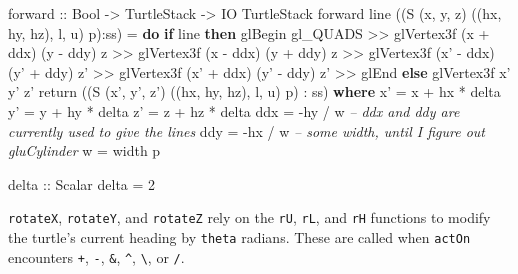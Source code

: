 \documentclass[]{article}
\newenvironment{Shaded}{}{}
\newcommand{\KeywordTok}[1]{\textcolor[rgb]{0.00,0.44,0.13}{\textbf{{#1}}}}
\newcommand{\DataTypeTok}[1]{\textcolor[rgb]{0.56,0.13,0.00}{{#1}}}
\newcommand{\DecValTok}[1]{\textcolor[rgb]{0.25,0.63,0.44}{{#1}}}
\newcommand{\CommentTok}[1]{\textcolor[rgb]{0.38,0.63,0.69}{\textit{{#1}}}}
\newcommand{\OtherTok}[1]{\textcolor[rgb]{0.00,0.44,0.13}{{#1}}}
\newcommand{\FunctionTok}[1]{\textcolor[rgb]{0.02,0.16,0.49}{{#1}}}
\newcommand{\NormalTok}[1]{{#1}}
\begin{document}
\begin{Shaded}
\begin{Highlighting}[]
\OtherTok{forward                              ::} \DataTypeTok{Bool} \OtherTok{->} \DataTypeTok{TurtleStack} \OtherTok{->} \DataTypeTok{IO} \DataTypeTok{TurtleStack}
\NormalTok{forward line ((}\DataTypeTok{S} \NormalTok{(x, y, z) ((hx, hy, hz), l, u) p)}\FunctionTok{:}\NormalTok{ss) }\FunctionTok{=} \KeywordTok{do}
  \KeywordTok{if} \NormalTok{line}
    \KeywordTok{then}
      \NormalTok{glBegin gl_QUADS }\FunctionTok{>>}
      \NormalTok{glVertex3f (x  }\FunctionTok{+} \NormalTok{ddx) (y  }\FunctionTok{-} \NormalTok{ddy) z  }\FunctionTok{>>}
      \NormalTok{glVertex3f (x  }\FunctionTok{-} \NormalTok{ddx) (y  }\FunctionTok{+} \NormalTok{ddy) z  }\FunctionTok{>>}
      \NormalTok{glVertex3f (x' }\FunctionTok{-} \NormalTok{ddx) (y' }\FunctionTok{+} \NormalTok{ddy) z' }\FunctionTok{>>}
      \NormalTok{glVertex3f (x' }\FunctionTok{+} \NormalTok{ddx) (y' }\FunctionTok{-} \NormalTok{ddy) z' }\FunctionTok{>>}
      \NormalTok{glEnd}
    \KeywordTok{else}
      \NormalTok{glVertex3f x' y' z'}
  \FunctionTok{return} \NormalTok{((}\DataTypeTok{S} \NormalTok{(x', y', z') ((hx, hy, hz), l, u) p) }\FunctionTok{:} \NormalTok{ss)}
    \KeywordTok{where} \NormalTok{x'  }\FunctionTok{=} \NormalTok{x }\FunctionTok{+} \NormalTok{hx }\FunctionTok{*} \NormalTok{delta}
          \NormalTok{y'  }\FunctionTok{=} \NormalTok{y }\FunctionTok{+} \NormalTok{hy }\FunctionTok{*} \NormalTok{delta}
          \NormalTok{z'  }\FunctionTok{=} \NormalTok{z }\FunctionTok{+} \NormalTok{hz }\FunctionTok{*} \NormalTok{delta}
          \NormalTok{ddx }\FunctionTok{=} \FunctionTok{-}\NormalTok{hy }\FunctionTok{/} \NormalTok{w      }\CommentTok{-- ddx and ddy are currently used to give the lines}
          \NormalTok{ddy }\FunctionTok{=} \FunctionTok{-}\NormalTok{hx }\FunctionTok{/} \NormalTok{w      }\CommentTok{-- some width, until I figure out gluCylinder}
          \NormalTok{w   }\FunctionTok{=} \NormalTok{width p}
\end{Highlighting}
\end{Shaded}
\begin{Shaded}
\begin{Highlighting}[]
\OtherTok{delta ::} \DataTypeTok{Scalar}
\NormalTok{delta }\FunctionTok{=} \DecValTok{2}
\end{Highlighting}
\end{Shaded}
\texttt{rotateX}, \texttt{rotateY}, and \texttt{rotateZ} rely on the
\texttt{rU}, \texttt{rL}, and \texttt{rH} functions to modify the
turtle's current heading by \texttt{theta} radians. These are called
when \texttt{actOn} encounters \texttt{+}, \texttt{-}, \texttt{\&},
\texttt{\^{}}, \texttt{\textbackslash{}}, or \texttt{/}.
\end{document}
